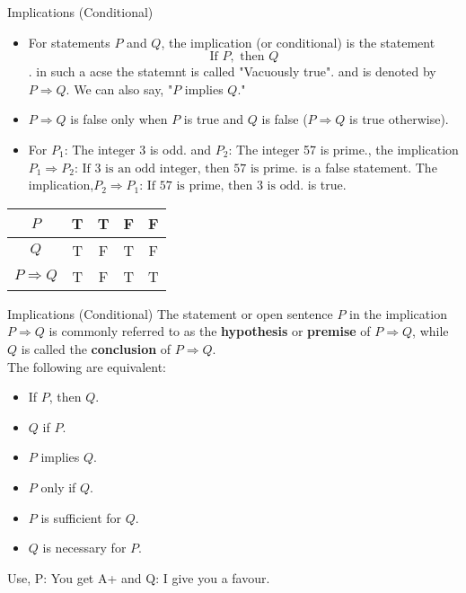 \documentclass{beamer}
\begin{document}
\begin{frame}{Implications (Conditional)}
    \begin{itemize}
    \item For statements $P$ and $Q$, the implication (or conditional) is the statement
    $$\text{If } P, \text{ then } Q$$. in such a acse the statemnt is called "Vacuously true".
    and is denoted by $P \Rightarrow Q$. We can also say, "$P$ implies $Q$."
    \item $P \Rightarrow Q$ is false only when $P$ is true and $Q$ is false ($P \Rightarrow Q$ is true otherwise).
    \item For $P_1$: The integer 3 is odd. and $P_2$: The integer 57 is prime., the implication
    $P_1 \Rightarrow P_2 \text{: If 3 is an odd integer, then 57 is prime.}$
    is a false statement. The implication,$P_2 \Rightarrow P_1 \text{: If 57 is prime, then 3 is odd.}$
is true.
    \end{itemize}
    \begin{center}
\begin{tabular}{|c|c|c|c|c|}
    \hline
    $P$ & T & T & F & F \\
    \hline
    $Q$ & T & F & T & F \\
    \hline
    $P \Rightarrow Q$ & T & F & T & T \\
    \hline
\end{tabular}
\end{center}
\end{frame}

\begin{frame}{Implications (Conditional)}
    The statement or open sentence $P$ in the implication $P \Rightarrow Q$ is commonly referred to as the \textbf{hypothesis} or \textbf{premise} of $P \Rightarrow Q$, while $Q$ is called the \textbf{conclusion} of $P \Rightarrow Q$.\\

    \vspace{0.2cm}
    The following are equivalent: 
    \begin{itemize}
    
    \item If $P$, then $Q$.
    \item $Q$ if $P$.
    \item $P$ implies $Q$.
    \item $P$ only if $Q$.
    \item $P$ is sufficient for $Q$.
    \item $Q$ is necessary for $P$.
    \end{itemize}

Use, P: You get A+ and Q: I give you a favour.
\end{frame}
\end{document}
